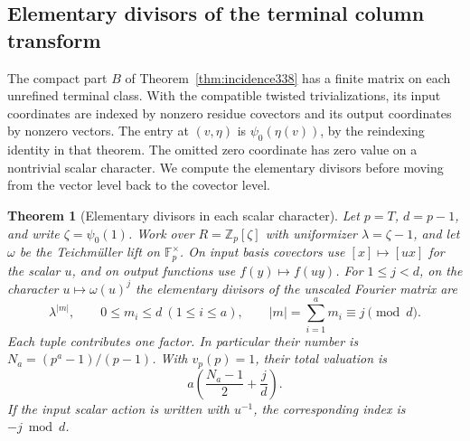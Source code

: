 \documentclass[a4paper,11pt]{article}
\newtheorem{theorem}[proposition]{Theorem}
\theoremstyle{definition}
\theoremstyle{remark}
\numberwithin{equation}{section}
\begin{document}
\subsection{Elementary divisors of the terminal column transform}\label{sec:fouriersmith338}
The compact part \(B\) of Theorem~\ref{thm:incidence338} has a
finite matrix on each unrefined terminal class. With the compatible
twisted trivializations, its input coordinates are indexed by
nonzero residue covectors and its output coordinates by nonzero
vectors. The entry at \((v,\eta)\) is \(\psi_0(\eta(v))\), by the
reindexing identity in that theorem. The omitted zero coordinate
has zero value on a nontrivial scalar character. We compute the
elementary divisors before moving from the vector level back to
the covector level.

\begin{theorem}[Elementary divisors in each scalar character]\label{thm:fouriersmith338}
Let \(p=T\), \(d=p-1\), and write \(\zeta=\psi_0(1)\).
Work over \(R=\mathbb Z_p[\zeta]\) with uniformizer
\(\lambda=\zeta-1\), and let \(\omega\) be the Teichm\"uller
lift on \(\mathbb F_p^\times\). On input basis covectors use
\([x]\mapsto[ux]\) for the scalar \(u\), and on output functions
use \(f(y)\mapsto f(uy)\). For \(1\le j<d\), on the character
\(u\mapsto\omega(u)^j\) the elementary divisors of the unscaled
Fourier matrix are
\[
      \lambda^{|m|},\qquad 0\le m_i\le d\ (1\le i\le a),
       \qquad |m|=\sum_{i=1}^a m_i\equiv j\pmod d .
\]
Each tuple contributes one factor. In particular their number is
\(N_a=(p^a-1)/(p-1)\). With \(v_p(p)=1\), their total valuation is
\[
                    a\left(\frac{N_a-1}{2}+\frac jd\right).
\]
If the input scalar action is written with \(u^{-1}\), the
corresponding index is \(-j\bmod d\).
\end{theorem}
\end{document}
